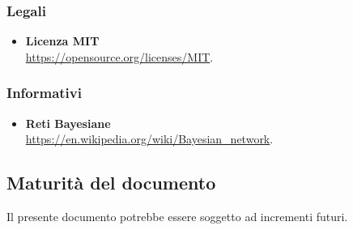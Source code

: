 \subsubsection{Legali}
\begin{itemize}
	\item{\textbf{Licenza MIT}\\
		\url{https://opensource.org/licenses/MIT}}.
\end{itemize}
\subsubsection{Informativi}
\begin{itemize}
	\item{\textbf{Reti Bayesiane}\\
			\url{https://en.wikipedia.org/wiki/Bayesian_network}}.
\end{itemize}

\subsection{Maturità del documento}
Il presente documento potrebbe essere soggetto ad incrementi futuri.
\pagebreak